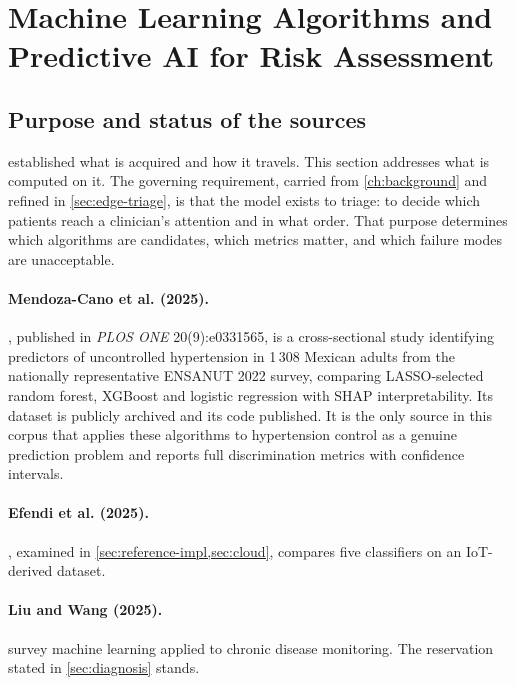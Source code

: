 \documentclass[12pt,a4paper,oneside]{report}
\begin{document}
\section{Machine Learning Algorithms and Predictive AI for Risk Assessment}\label{sec:ml}

\subsection*{Purpose and status of the sources}

 established what is acquired and how it travels. This section addresses what is computed on it. The governing requirement, carried from \cref{ch:background} and refined in \cref{sec:edge-triage}, is that the model exists to triage: to decide which patients reach a clinician's attention and in what order. That purpose determines which algorithms are candidates, which metrics matter, and which failure modes are unacceptable.

\paragraph{Mendoza-Cano et al. (2025).} \textcite{mendoza2025}, published in \emph{PLOS ONE} 20(9):e0331565, is a cross-sectional study identifying predictors of uncontrolled hypertension in 1\,308 Mexican adults from the nationally representative ENSANUT 2022 survey, comparing LASSO-selected random forest, XGBoost and logistic regression with SHAP interpretability. Its dataset is publicly archived and its code published. It is the only source in this corpus that applies these algorithms to hypertension control as a genuine prediction problem and reports full discrimination metrics with confidence intervals.

\paragraph{Efendi et al. (2025).} \textcite{efendi2025}, examined in \cref{sec:reference-impl,sec:cloud}, compares five classifiers on an IoT-derived dataset.

\paragraph{Liu and Wang (2025).} \textcite{liu2025review} survey machine learning applied to chronic disease monitoring. The reservation stated in \cref{sec:diagnosis} stands.
\end{document}
